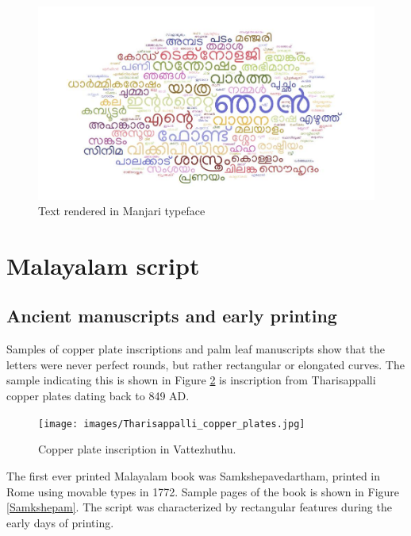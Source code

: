 \documentclass[11pt,twoside,a4paper,parskip=half]{scrartcl}
\begin{document}
\begin{figure}[h!]
	\includegraphics[width=\textwidth]{images/wordcloud.jpg}
	\caption{Text rendered in Manjari typeface}
	\label{wordcloud}
\end{figure} 

\section{Malayalam script}

\subsection{Ancient manuscripts and early printing}

Samples of copper plate inscriptions and palm leaf manuscripts show that the letters were never perfect rounds, but rather rectangular or elongated curves. The sample indicating this is shown in Figure \ref{vattezhuthu} is inscription from Tharisappalli copper plates dating back to 849 AD.


\begin{figure}[h!]
	\texttt{[image: images/Tharisappalli\_copper\_plates.jpg]}
	\caption{Copper plate inscription in Vattezhuthu.}
	\label{vattezhuthu}
\end{figure} 

The first ever printed Malayalam book was Samkshepavedartham\cite{samkshepavedartham}, printed in Rome using movable types in 1772. Sample pages of the book is shown in Figure \ref{Samkshepam}. The script was characterized by rectangular features during the early days of printing. 
\end{document}
